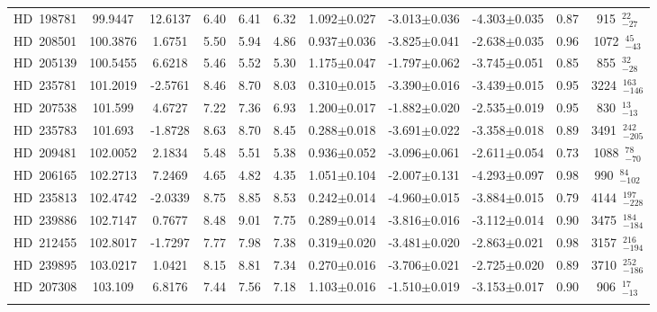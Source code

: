 {\begin{longtable}{lcccccccccc}
\noalign{\smallskip}
HD~198781 & 99.9447 & 12.6137 & 6.40 & 6.41 & 6.32 & 1.092$\pm$0.027 & -3.013$\pm$0.036 & -4.303$\pm$0.035 & 0.87 & 915~$_{-27}^{22}$ \\
\noalign{\smallskip}
HD~208501 & 100.3876 & 1.6751 & 5.50 & 5.94 & 4.86 & 0.937$\pm$0.036 & -3.825$\pm$0.041 & -2.638$\pm$0.035 & 0.96 & 1072~$_{-43}^{45}$ \\
\noalign{\smallskip}
HD~205139 & 100.5455 & 6.6218 & 5.46 & 5.52 & 5.30 & 1.175$\pm$0.047 & -1.797$\pm$0.062 & -3.745$\pm$0.051 & 0.85 & 855~$_{-28}^{32}$ \\
\noalign{\smallskip}
HD~235781 & 101.2019 & -2.5761 & 8.46 & 8.70 & 8.03 & 0.310$\pm$0.015 & -3.390$\pm$0.016 & -3.439$\pm$0.015 & 0.95 & 3224~$_{-146}^{163}$ \\
\noalign{\smallskip}
HD~207538 & 101.599 & 4.6727 & 7.22 & 7.36 & 6.93 & 1.200$\pm$0.017 & -1.882$\pm$0.020 & -2.535$\pm$0.019 & 0.95 & 830~$_{-13}^{13}$ \\
\noalign{\smallskip}
HD~235783 & 101.693 & -1.8728 & 8.63 & 8.70 & 8.45 & 0.288$\pm$0.018 & -3.691$\pm$0.022 & -3.358$\pm$0.018 & 0.89 & 3491~$_{-205}^{242}$ \\
\noalign{\smallskip}
HD~209481 & 102.0052 & 2.1834 & 5.48 & 5.51 & 5.38 & 0.936$\pm$0.052 & -3.096$\pm$0.061 & -2.611$\pm$0.054 & 0.73 & 1088~$_{-70}^{78}$ \\
\noalign{\smallskip}
HD~206165 & 102.2713 & 7.2469 & 4.65 & 4.82 & 4.35 & 1.051$\pm$0.104 & -2.007$\pm$0.131 & -4.293$\pm$0.097 & 0.98 & 990~$_{-102}^{84}$ \\
\noalign{\smallskip}
HD~235813 & 102.4742 & -2.0339 & 8.75 & 8.85 & 8.53 & 0.242$\pm$0.014 & -4.960$\pm$0.015 & -3.884$\pm$0.015 & 0.79 & 4144~$_{-228}^{197}$ \\
\noalign{\smallskip}
HD~239886 & 102.7147 & 0.7677 & 8.48 & 9.01 & 7.75 & 0.289$\pm$0.014 & -3.816$\pm$0.016 & -3.112$\pm$0.014 & 0.90 & 3475~$_{-184}^{184}$ \\
\noalign{\smallskip}
HD~212455 & 102.8017 & -1.7297 & 7.77 & 7.98 & 7.38 & 0.319$\pm$0.020 & -3.481$\pm$0.020 & -2.863$\pm$0.021 & 0.98 & 3157~$_{-194}^{216}$ \\
\noalign{\smallskip}
HD~239895 & 103.0217 & 1.0421 & 8.15 & 8.81 & 7.34 & 0.270$\pm$0.016 & -3.706$\pm$0.021 & -2.725$\pm$0.020 & 0.89 & 3710~$_{-186}^{252}$ \\
\noalign{\smallskip}
HD~207308 & 103.109 & 6.8176 & 7.44 & 7.56 & 7.18 & 1.103$\pm$0.016 & -1.510$\pm$0.019 & -3.153$\pm$0.017 & 0.90 & 906~$_{-13}^{17}$ \\
\noalign{\smallskip}

\end{longtable}}
